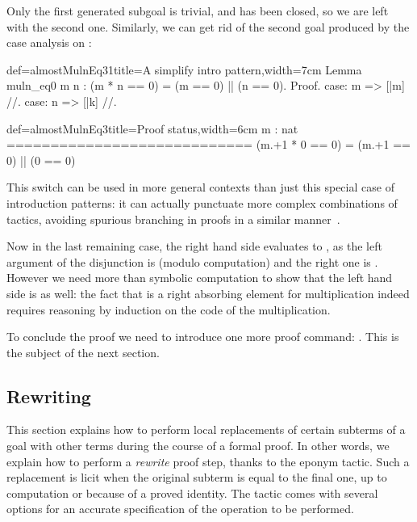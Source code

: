 Only the first generated subgoal is trivial, and has been closed, so
we are left with the second one. Similarly, we can get rid of the
second goal produced by the case analysis on :

\begin{coq}{def=almostMulnEq31}{title=A simplify intro pattern,width=7cm}
Lemma muln_eq0 m n :
  (m * n == 0) = (m == 0) || (n == 0).
Proof.
case: m => [|m] //.
case: n => [|k] //.
\end{coq}
\begin{coqout}{def=almostMulnEq3}{title=Proof status,width=6cm}
m : nat
============================
(m.+1 * 0 == 0) =
(m.+1 == 0) || (0 == 0)
\end{coqout}

This \C{//} switch can be used in
more general contexts than just this special case of introduction patterns:
it can actually punctuate more complex combinations of tactics,
avoiding spurious branching in proofs in a similar manner~\cite{ssrman}.

Now in the last remaining case, the right hand side evaluates to
, as the left argument of the disjunction is  (modulo
computation) and the right one is . However we need
more than symbolic computation to show that the left hand side is
 as well: the fact that  is a right absorbing element for
multiplication indeed requires reasoning by induction on the code of the
multiplication. 

To conclude the proof we need to introduce one more proof command:
.  This is the subject of the next section.


\subsection{Rewriting}\label{ssec:rw}

This section explains how to perform local replacements of certain
subterms of a goal with other terms during the course of a formal
proof. In other words, we explain how to perform a
\emph{rewrite} proof step, thanks to the eponym  tactic.
Such a replacement is licit when the original subterm is equal
to the final one, up to computation or because of a proved
identity. The  tactic comes with several options for
an accurate specification of the operation to be performed.

